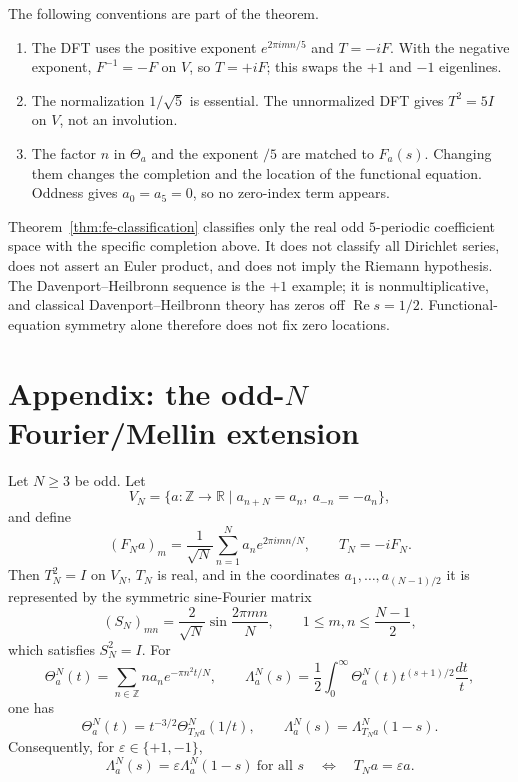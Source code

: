 \begin{remark}\label{rem:signs}
The following conventions are part of the theorem.
\begin{enumerate}
\item The DFT uses the positive exponent \(e^{2\pi imn/5}\) and \(T=-iF\). With the negative exponent, \(F^{-1}=-F\) on \(V\), so \(T=+iF\); this swaps the \(+1\) and \(-1\) eigenlines.
\item The normalization \(1/\sqrt5\) is essential. The unnormalized DFT gives \(T^2=5I\) on \(V\), not an involution.
\item The factor \(n\) in \(\Theta_a\) and the exponent \(/5\) are matched to \(F_a(s)\). Changing them changes the completion and the location of the functional equation. Oddness gives \(a_0=a_5=0\), so no zero-index term appears.
\end{enumerate}
\end{remark}

\begin{remark}[Scope]\label{rem:fe-scope}
Theorem~\ref{thm:fe-classification} classifies only the real odd \(5\)-periodic coefficient space with the specific completion above. It does not classify all Dirichlet series, does not assert an Euler product, and does not imply the Riemann hypothesis. The Davenport--Heilbronn sequence is the \(+1\) example; it is nonmultiplicative, and classical Davenport--Heilbronn theory has zeros off \(\operatorname{Re}s=1/2\). Functional-equation symmetry alone therefore does not fix zero locations.
\end{remark}

\appendix
\section*{Appendix: the odd-\(N\) Fourier/Mellin extension}

\begin{theorem}\label{thm:odd-N}
Let \(N\ge3\) be odd. Let
\[
V_N=\{a:\mathbb Z\to\mathbb R\mid a_{n+N}=a_n,\ a_{-n}=-a_n\},
\]
and define
\[
(F_Na)_m=\frac1{\sqrt N}\sum_{n=1}^N a_ne^{2\pi imn/N},
\qquad
T_N=-iF_N.
\]
Then \(T_N^2=I\) on \(V_N\), \(T_N\) is real, and in the coordinates
\(a_1,\dots,a_{(N-1)/2}\) it is represented by the symmetric sine-Fourier matrix
\[
(S_N)_{mn}=\frac2{\sqrt N}\sin\frac{2\pi mn}{N},
\qquad
1\le m,n\le\frac{N-1}{2},
\]
which satisfies \(S_N^2=I\). For
\[
\Theta_a^N(t)=\sum_{n\in\mathbb Z}na_ne^{-\pi n^2t/N},
\qquad
\Lambda_a^N(s)=\frac12\int_0^\infty\Theta_a^N(t)t^{(s+1)/2}\frac{dt}{t},
\]
one has
\[
\Theta_a^N(t)=t^{-3/2}\Theta_{T_Na}^N(1/t),
\qquad
\Lambda_a^N(s)=\Lambda_{T_Na}^N(1-s).
\]
Consequently, for \(\varepsilon\in\{+1,-1\}\),
\[
\Lambda_a^N(s)=\varepsilon\Lambda_a^N(1-s)\ \text{for all }s
\quad\Longleftrightarrow\quad
T_Na=\varepsilon a.
\]
\end{theorem}

